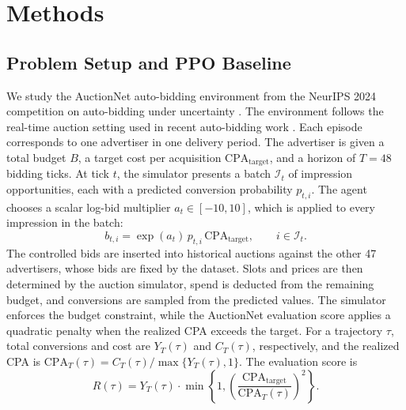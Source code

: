 \documentclass{article}
\begin{document}
\section{Methods}
%

\subsection{Problem Setup and PPO Baseline}
We study the AuctionNet auto-bidding environment from the NeurIPS 2024 competition on auto-bidding under uncertainty \citep{xu2024autobidding}.
The environment follows the real-time auction setting used in recent
auto-bidding work \citep{chiappa2025autobidding}. Each
episode corresponds to one advertiser in one delivery period. The advertiser is
given a total budget \(B\), a target cost per acquisition
\(\mathrm{CPA}_{\mathrm{target}}\), and a horizon of \(T=48\) bidding ticks.
At tick \(t\), the simulator presents a batch \(\mathcal{I}_t\) of impression
opportunities, each with a predicted conversion probability
\(p_{t,i}\). The agent chooses a scalar log-bid multiplier
\(a_t \in [-10,10]\), which is applied to every impression in the batch:
\[
  b_{t,i} = \exp(a_t)\,p_{t,i}\,\mathrm{CPA}_{\mathrm{target}},
  \qquad i \in \mathcal{I}_t.
\]
The controlled bids are inserted into historical auctions against the other
47 advertisers, whose bids are fixed by the dataset. Slots and prices are then
determined by the auction simulator, spend is deducted from the remaining
budget, and conversions are sampled from the predicted values. The simulator
enforces the budget constraint, while the AuctionNet evaluation score applies a
quadratic penalty when the realized CPA exceeds the target. For a trajectory
\(\tau\), total conversions and cost are \(Y_T(\tau)\) and \(C_T(\tau)\),
respectively, and the realized CPA is
\(\mathrm{CPA}_T(\tau)=C_T(\tau)/\max\{Y_T(\tau),1\}\). The evaluation score is
\[
  R(\tau) =
  Y_T(\tau) \cdot
  \min\!\left\{1,
  \left(\frac{\mathrm{CPA}_{\mathrm{target}}}{\mathrm{CPA}_T(\tau)}\right)^2
  \right\}.
\]
\end{document}

